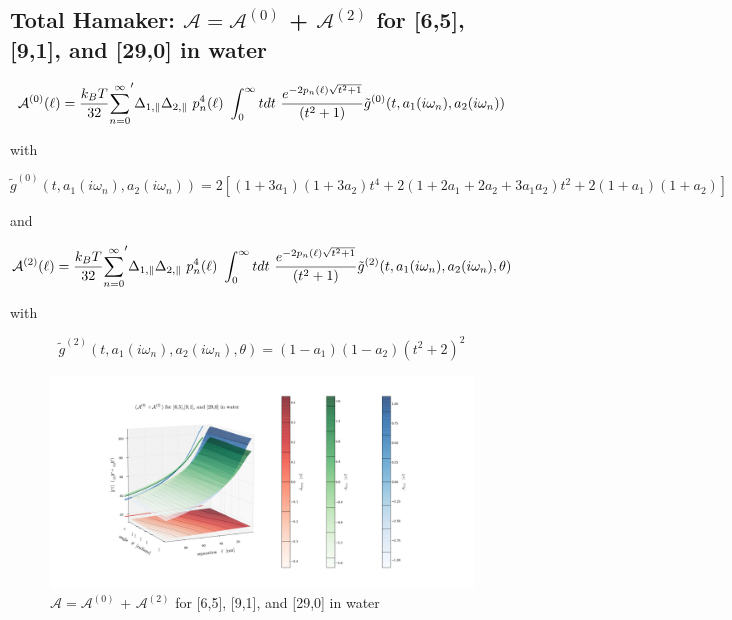\documentclass[a4paper]{article}
\begin{document}
\begin{center}
\subsection{Total Hamaker: $\mathcal{A} = \mathcal{A}^{(0)}$ + $\mathcal{A}^{(2)}$ for [6,5], [9,1], and [29,0] in water }
\begin{equation}
{\cal A}^{(0)}(\ell) = \frac{k_BT}{32}  {\sum_{n=0}^{\infty}}' \Delta_{1,\parallel} \Delta_{2,\parallel} ~p_n^{4}(\ell) ~\int_0^{\infty} t dt ~\frac{e^{- 2 p_n(\ell) \sqrt{t^{2} + 1}}}{(t^{2} + 1)} \tilde g^{(0)}(t, a_1(i \omega_n), a_2(i \omega_n))
\end{equation}

with

\begin{equation}
\tilde g^{(0)}(t, a_1(i \omega_n), a_2(i \omega_n)) = 2 \left[ (1+3a_1)(1+3a_2) t^{4} + 2 (1+2a_1+2a_2+3a_1a_2) t^{2}  + 2(1+a_1)(1+a_2)\right]
\end{equation}

and

\begin{equation}
{\cal A}^{(2)}(\ell) = \frac{k_BT}{32}  {\sum_{n=0}^{\infty}}' \Delta_{1,\parallel} \Delta_{2,\parallel} ~p_n^{4}(\ell) ~\int_0^{\infty} t dt ~\frac{e^{- 2 p_n(\ell) \sqrt{t^{2} + 1}}}{(t^{2} + 1)} \tilde g^{(2)}(t, a_1(i \omega_n), a_2(i \omega_n), \theta)
\end{equation}

with

\begin{equation}
\tilde g^{(2)}(t, a_1(i \omega_n), a_2(i \omega_n), \theta) = (1-a_1)(1-a_2)(t^{2} + 2)^2
\label{befgqw}
\end{equation}

\begin{figure}[t!]
\begin{center}
\includegraphics[width=1.5\textwidth]{plots/A_65_91_290_srw.png}
\hskip 43pt
\caption{$\mathcal{A} = \mathcal{A}^{(0)}$ + $\mathcal{A}^{(2)}$ for [6,5], [9,1], and [29,0] in water}
\label{eiz65}
\end{center}
\end{figure} 


\end{center}
\end{document}
